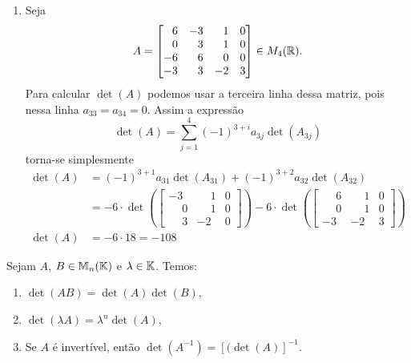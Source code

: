 \begin{exemplo}
\begin{enumerate}[label={\arabic*})]
	    \item Seja
	        \[
	            A = \begin{bmatrix}
	                \phantom{-}6 & -3 & \phantom{-}1 & 0\\
	                \phantom{-}0 & \phantom{-}3 & \phantom{-}1 & 0\\
	                -6 & \phantom{-}6 & \phantom{-}0 & 0\\
	                -3 & \phantom{-}3 & -2 & 3
	            \end{bmatrix} \in M_4(\mathbb{R}).
	        \]
	        Para calcular $\det(A)$ podemos usar a terceira linha dessa matriz, pois nessa linha $a_{33} = a_{34} = 0$. Assim a expressão
	        \[
	            \det(A) = \sum_{j = 1}^4(-1)^{3 + i}a_{3j}\det(A_{3j})
	        \]
	        torna-se simplesmente
	        \begin{align*}
	            \det(A) &= (-1)^{3 + 1}a_{31}\det(A_{31}) + (-1)^{3 + 2}a_{32}\det(A_{32}) \\ &=
	            -6\cdot\det\left(\begin{bmatrix}-3 & \phantom{-}1 & 0\\\phantom{-}0 & \phantom{-}1 & 0\\\phantom{-}3 & -2 & 0\end{bmatrix}\right) -6\cdot\det\left(\begin{bmatrix}\phantom{-}6 & \phantom{-}1 & 0\\\phantom{-}0 & \phantom{-}1 & 0\\-3 & -2 & 3\end{bmatrix}\right)\\
	            \det(A) &= -6\cdot 18 = -108
	        \end{align*}
	\end{enumerate}
\end{exemplo}

\begin{proposicao}
	Sejam $A$, $B \in \mathbb{M}_n(\mathbb{K})$ e $\lambda \in \mathbb{K}$. Temos:
	\begin{enumerate}[label={\roman*})]
		\item $\det(AB) = \det(A) \det(B)$,
		\item $\det(\lambda A) = \lambda^n \det(A)$,
		\item Se $A$ é invertível, então $\det(A^{-1}) = [(\det(A)]^{-1}$.
	\end{enumerate}
\end{proposicao}


